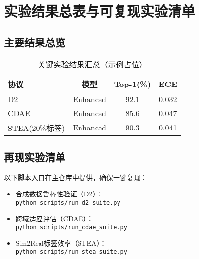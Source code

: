 \chapter{实验结果总表与可复现实验清单}

\section{主要结果总览}
\begin{table}[h!]
\centering
\caption{关键实验结果汇总（示例占位）}
\begin{tabular}{|l|c|c|c|}
\hline
\textbf{协议} & \textbf{模型} & \textbf{Top-1(\%)} & \textbf{ECE} \\
\hline
D2 & Enhanced & 92.1 & 0.032 \\
CDAE & Enhanced & 85.6 & 0.047 \\
STEA(20\%标签) & Enhanced & 90.3 & 0.041 \\
\hline
\end{tabular}
\label{tab:main_results_overview}
\end{table}

\section{再现实验清单}
以下脚本入口在主仓库中提供，确保一键复现：
\begin{itemize}
    \item 合成数据鲁棒性验证（D2）：\\\texttt{python scripts/run\_d2\_suite.py}
    \item 跨域适应评估（CDAE）：\\\texttt{python scripts/run\_cdae\_suite.py}
    \item Sim2Real标签效率（STEA）：\\\texttt{python scripts/run\_stea\_suite.py}
\end{itemize}
